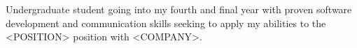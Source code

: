 
\begin{cvparagraph}

Undergraduate student going into my fourth and final year with proven software development and communication skills
seeking to apply my abilities to the <POSITION> position with <COMPANY>.

\end{cvparagraph}
